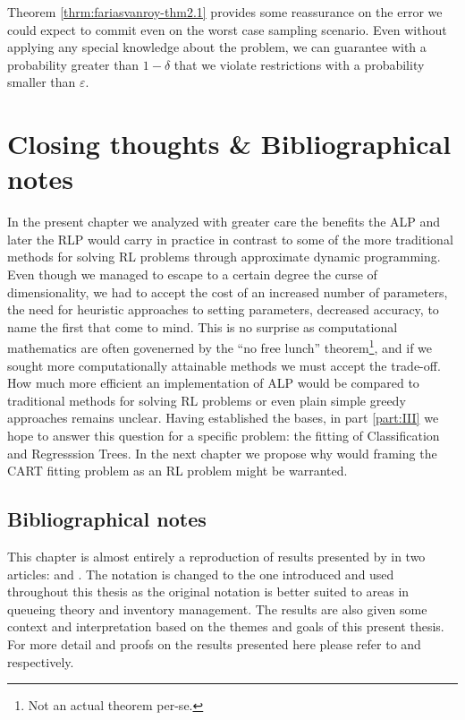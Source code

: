 Theorem \ref{thrm:fariasvanroy-thm2.1} provides some reassurance on the error we
could expect to commit even on the worst case sampling scenario. Even without
applying any special knowledge about the problem, we can guarantee with a
probability greater than $1 - \delta$ that we violate restrictions with a
probability smaller than $\varepsilon$.

\section{Closing thoughts \& Bibliographical notes}

In the present chapter we analyzed with greater care the benefits the ALP and
later the RLP would carry in practice in contrast to some of the more
traditional methods for solving RL problems through approximate dynamic
programming. Even though we managed to escape to a certain degree the curse of
dimensionality, we had to accept the cost of an increased number of parameters,
the need for heuristic approaches to setting parameters, decreased accuracy, to
name the first that come to mind. This is no surprise as computational
mathematics are often govenerned by the ``no free lunch'' theorem\footnote{Not
an actual theorem per-se.}, and if we sought more computationally attainable
methods we must accept the trade-off. How much more efficient an implementation
of ALP would be compared to traditional methods for solving RL problems or even
plain simple greedy approaches remains unclear. Having established the bases, in
part \ref{part:III} we hope to answer this question for a specific problem: the
fitting of Classification and Regresssion Trees. In the next chapter we propose
why would framing the CART fitting problem as an RL problem might be warranted.

\subsection{Bibliographical notes}

This chapter is almost entirely a reproduction of results presented by
\citeauthor{farias2003LP2ADP} in two articles:  and
. The notation is changed to the one introduced
and used throughout this thesis as the original notation is better suited to
areas in queueing theory and inventory management. The results are also given
some context and interpretation based on the themes and goals of this present
thesis. For more detail and proofs on the results presented here please refer to
\cite{farias2003LP2ADP} and \cite{farias2004constraint} respectively.